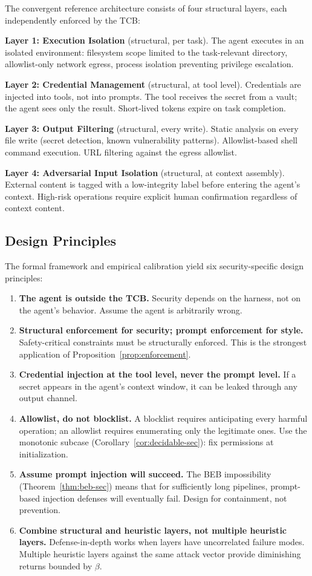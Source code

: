 \documentclass[11pt, a4paper]{googledeepmind}
\begin{document}
The convergent reference architecture consists of four structural layers, each independently enforced by the TCB:

\textbf{Layer 1: Execution Isolation} (structural, per task). The agent executes in an isolated environment: filesystem scope limited to the task-relevant directory, allowlist-only network egress, process isolation preventing privilege escalation.

\textbf{Layer 2: Credential Management} (structural, at tool level). Credentials are injected into tools, not into prompts. The tool receives the secret from a vault; the agent sees only the result. Short-lived tokens expire on task completion.

\textbf{Layer 3: Output Filtering} (structural, every write). Static analysis on every file write (secret detection, known vulnerability patterns). Allowlist-based shell command execution. URL filtering against the egress allowlist.

\textbf{Layer 4: Adversarial Input Isolation} (structural, at context assembly). External content is tagged with a low-integrity label before entering the agent's context. High-risk operations require explicit human confirmation regardless of context content.

\subsection{Design Principles}

The formal framework and empirical calibration yield six security-specific design principles:

\begin{enumerate}
    \item \textbf{The agent is outside the TCB.} Security depends on the harness, not on the agent's behavior. Assume the agent is arbitrarily wrong.
    \item \textbf{Structural enforcement for security; prompt enforcement for style.} Safety-critical constraints must be structurally enforced. This is the strongest application of Proposition~\ref{prop:enforcement}.
    \item \textbf{Credential injection at the tool level, never the prompt level.} If a secret appears in the agent's context window, it can be leaked through any output channel.
    \item \textbf{Allowlist, do not blocklist.} A blocklist requires anticipating every harmful operation; an allowlist requires enumerating only the legitimate ones. Use the monotonic subcase (Corollary~\ref{cor:decidable-sec}): fix permissions at initialization.
    \item \textbf{Assume prompt injection will succeed.} The BEB impossibility (Theorem~\ref{thm:beb-sec}) means that for sufficiently long pipelines, prompt-based injection defenses will eventually fail. Design for containment, not prevention.
    \item \textbf{Combine structural and heuristic layers, not multiple heuristic layers.} Defense-in-depth works when layers have uncorrelated failure modes. Multiple heuristic layers against the same attack vector provide diminishing returns bounded by $\beta$.
\end{enumerate}
\end{document}
